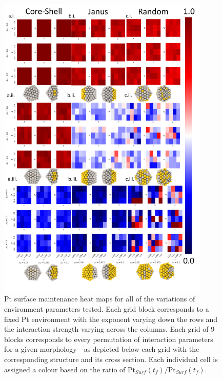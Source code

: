\begin{figure}
     \centering
      \includegraphics[width=0.9\textwidth]{figures/MD/Env/PtSurf_Env.pdf}
    \caption{Pt surface maintenance heat maps for all of the variations of environment parameters tested. Each grid block corresponds to a fixed Pt environment with the exponent varying down the rows and the interaction strength varying across the columns. Each grid of $9$ blocks corresponds to every permutation of interaction parameters for a given morphology - as depicted below each grid with the corresponding structure and its cross section. Each individual cell is assigned a colour based on the ratio of Pt$_{Surf}(t_{f})/$Pt$_{Surf}(t_{f})$.}
    \label{fig:PtSurf_Env}
\end{figure}

